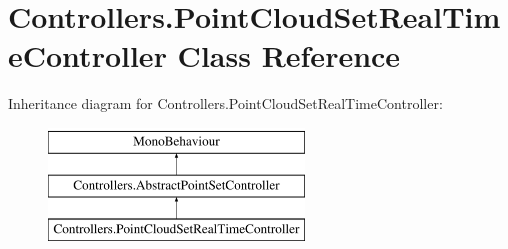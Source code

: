 \hypertarget{class_controllers_1_1_point_cloud_set_real_time_controller}{}\section{Controllers.\+Point\+Cloud\+Set\+Real\+Time\+Controller Class Reference}
\label{class_controllers_1_1_point_cloud_set_real_time_controller}
Inheritance diagram for Controllers.\+Point\+Cloud\+Set\+Real\+Time\+Controller\+:\begin{figure}[H]
\begin{center}
\leavevmode
\includegraphics[height=3.000000cm]{class_controllers_1_1_point_cloud_set_real_time_controller}
\end{center}
\end{figure}
